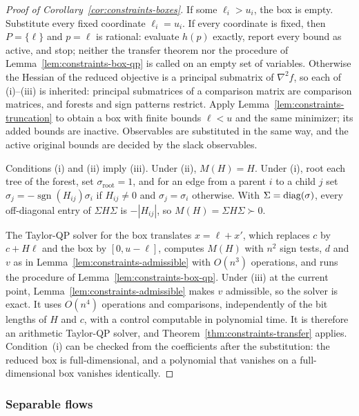 \begin{proof}[Proof of Corollary~\ref{cor:constraints-boxes}]
If some $\ell_i>u_i$, the box is empty. Substitute every fixed coordinate
$\ell_i=u_i$. If every coordinate is fixed, then $P=\{\ell\}$ and $p=\ell$ is
rational: evaluate $h(p)$ exactly, report every bound as active, and stop;
neither the transfer theorem nor the procedure of
Lemma~\ref{lem:constraints-box-qp} is called on an empty set of variables.
Otherwise the Hessian of the reduced objective is a principal submatrix of
$\nabla^2f$, so each of (i)--(iii) is inherited: principal submatrices of a
comparison matrix are comparison matrices, and forests and sign patterns
restrict. Apply Lemma~\ref{lem:constraints-truncation} to obtain a box with
finite bounds $\ell<u$ and the same minimizer; its added bounds are inactive.
Observables are substituted in the same way, and the active original bounds
are decided by the slack observables.

Conditions (i) and (ii) imply (iii). Under (ii), $M(H)=H$. Under (i), root each
tree of the forest, set $\sigma_{\mathrm{root}}=1$, and for an edge from a
parent $i$ to a child $j$ set $\sigma_j=-\operatorname{sgn}(H_{ij})\sigma_i$
if $H_{ij}\ne0$ and $\sigma_j=\sigma_i$ otherwise. With
$\Sigma=\operatorname{diag}(\sigma)$, every off-diagonal entry of $\Sigma H\Sigma$ is
$-|H_{ij}|$, so $M(H)=\Sigma H\Sigma\succ0$.

The Taylor-QP solver for the box translates $x=\ell+x'$, which replaces $c$ by
$c+H\ell$ and the box by $[0,u-\ell]$, computes $M(H)$ with $n^2$ sign tests,
$d$ and $v$ as in Lemma~\ref{lem:constraints-admissible} with $O(n^3)$
operations, and runs the procedure of Lemma~\ref{lem:constraints-box-qp}.
Under (iii) at the current point, Lemma~\ref{lem:constraints-admissible}
makes $v$ admissible, so the solver is exact. It uses $O(n^4)$ operations and
comparisons, independently of the bit lengths of $H$ and $c$, with a control
computable in polynomial time. It is therefore an arithmetic Taylor-QP solver,
and Theorem~\ref{thm:constraints-transfer} applies. Condition~(i) can be
checked from the coefficients after the substitution: the reduced box is
full-dimensional, and a polynomial that vanishes on a full-dimensional box
vanishes identically.
\end{proof}

\subsubsection{Separable flows}
\label{app:constraints-flows}

